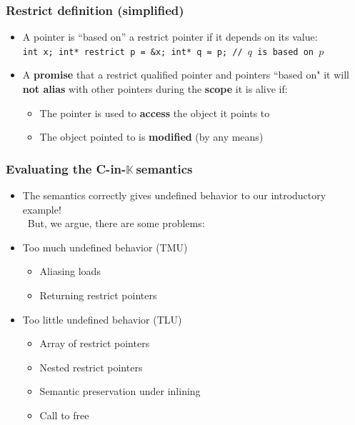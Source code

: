 \documentclass[aspectratio=169, c]{beamer}
\makeatletter
\def\eg{\textit{e.g.}\@\xspace}
\def\cink{C-in-$\mathbb{K}\ $}
\def\cinkrestrict{\cink} %
\makeatother
\begin{document}
\begin{frame}
\frametitle{Restrict definition (simplified)}
\begin{itemize}
    \item A pointer is ``based on'' a restrict pointer if it depends on its value: \\
        \texttt{int x; int* restrict p = &x; int* q = p; // $q$ is based on $p$}  
    \item A \textbf{promise} that a restrict qualified pointer and pointers ``based on" it will \textbf{not alias} with other pointers during the \textbf{scope} it is alive if:
            \begin{itemize}
                \item The pointer is used to \textbf{access} the object it points to
                \item The object pointed to is \textbf{modified} (by any means)
            \end{itemize}
\end{itemize}
\end{frame}









\begin{frame}
\frametitle{Evaluating the \cinkrestrict semantics}
\begin{itemize}
\item The semantics correctly gives undefined behavior to our introductory example! \\ \ But, we argue, there are some problems: \\
\item Too much undefined behavior (TMU)
    \begin{itemize}
        \item \colorbox{ao!20}{Aliasing loads}
        \item Returning restrict pointers
    \end{itemize}
\item Too little undefined behavior (TLU)
    \begin{itemize}
        \item Array of restrict pointers
        \item Nested restrict pointers
        \item Semantic preservation under inlining
        \item Call to free  
    \end{itemize}
\end{itemize}

\end{frame}
\end{document}

